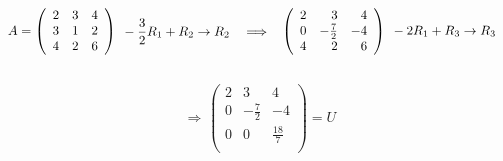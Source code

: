 \documentclass{article}
\begin{document}
\[
A = 
\left(
\begin{array}{rrr}
2 & 3 & 4 \\
3 & 1 & 2 \\
4 & 2 & 6 \\
\end{array}
\right)
\hspace{0.1cm}
\begin{aligned}
& -\frac{3}{2}R_1 + R_2 \rightarrow R_2 \quad\Longrightarrow
\end{aligned}
\left(
\begin{array}{rrr}
2 & 3 & 4 \\
0 & -\frac{7}{2} & -4 \\
4 & 2 & 6 \\
\end{array}
\right)
\hspace{0.1cm}
\begin{aligned}
& -2R_1 + R_3 \rightarrow R_3
\end{aligned}
\]\\

\[
\begin{aligned}
\Longrightarrow
\end{aligned}
\left(
\begin{array}{rrr}
2 & 3 & 4 \\
0 & -\frac{7}{2} & -4 \\
0 & 0 & \frac{18}{7} \\
\end{array}
\right) = U
\]\\
\end{document}
